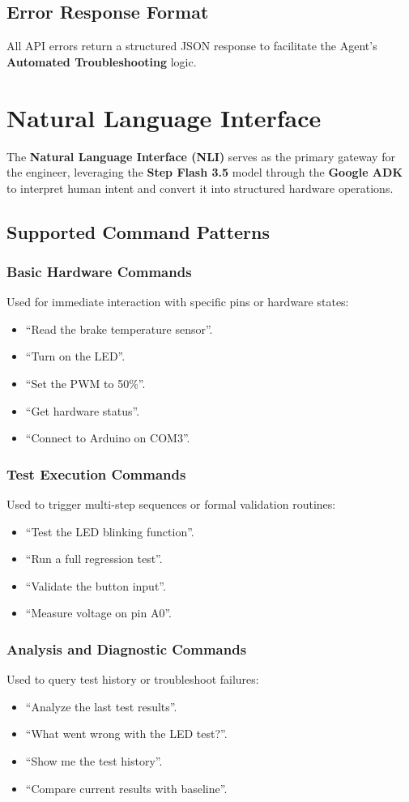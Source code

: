 \documentclass[conference]{IEEEtran}
\begin{document}
\subsection{Error Response Format}
All API errors return a structured JSON response to facilitate the Agent's \textbf{Automated Troubleshooting} logic.

\section{Natural Language Interface}
The \textbf{Natural Language Interface (NLI)} serves as the primary gateway for the engineer, leveraging the \textbf{Step Flash 3.5} model through the \textbf{Google ADK} to interpret human intent and convert it into structured hardware operations.

\subsection{Supported Command Patterns}
\subsubsection{Basic Hardware Commands}
Used for immediate interaction with specific pins or hardware states:
\begin{itemize}
    \item ``Read the brake temperature sensor''.
    \item ``Turn on the LED''.
    \item ``Set the PWM to 50\%''.
    \item ``Get hardware status''.
    \item ``Connect to Arduino on COM3''.
\end{itemize}
\subsubsection{Test Execution Commands}
Used to trigger multi-step sequences or formal validation routines:
\begin{itemize}
    \item ``Test the LED blinking function''.
    \item ``Run a full regression test''.
    \item ``Validate the button input''.
    \item ``Measure voltage on pin A0''.
\end{itemize}
\subsubsection{Analysis and Diagnostic Commands}
Used to query test history or troubleshoot failures:
\begin{itemize}
    \item ``Analyze the last test results''.
    \item ``What went wrong with the LED test?''.
    \item ``Show me the test history''.
    \item ``Compare current results with baseline''.
\end{itemize}
\end{document}
